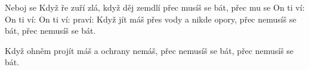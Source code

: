 \begin{TEXT}{Neboj se}
\SLOKA	Když ře zuří zlá,\NL
  	když děj zemdlí\NL
	přec musíš se bát,\NL
	přec mu se 
\REFREN  	On ti ví: \NL
	On ti ví: \NL
	On ti ví: \NL
	praví: 
\SLOKA	Když jít máš přes vody\NL
	a nikde opory,\NL
	přec nemusíš se bát,\NL
	přec nemusíš se bát.
\REFRENHRAJ

\SLOKA	Když ohněm projít máš\NL
	a ochrany nemáš,\NL
	přec nemusíš se bát,\NL
	přec nemusíš se bát.
\REFRENHRAJ
\end{TEXT}
